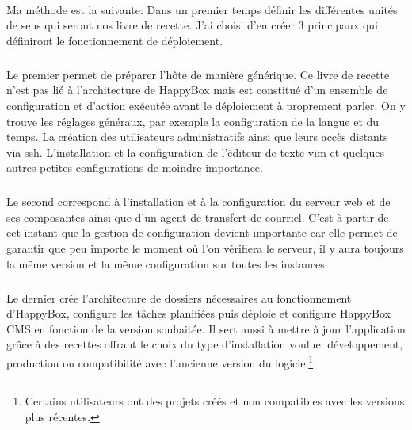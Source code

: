 \documentclass[11pt, a4paper ]{article}
\begin{document}
\begin{spacing}{1.5}
\paragraph{}
Ma méthode est la suivante: Dans un premier temps définir les différentes unités de sens qui seront nos livre de recette. J'ai choisi d'en créer 3 principaux qui définiront le fonctionnement de déploiement.
\subparagraph{}
Le premier permet de préparer l’hôte de manière générique. Ce livre de recette n'est pas lié à l'architecture de HappyBox mais est constitué d'un ensemble de configuration et d'action exécutée avant le déploiement à proprement parler. On y trouve les réglages généraux, par exemple la configuration de la langue et du temps. La création des utilisateurs administratifs ainsi que leurs accès distants via ssh. L'installation et la configuration de l’éditeur de texte vim et quelques autres petites configurations de moindre importance.
\subparagraph{}
Le second correspond à l'installation et à la configuration du serveur web et de ses composantes ainsi que d'un agent de transfert de courriel. C'est à partir de cet instant que la gestion de configuration devient importante car elle permet de garantir que peu importe le moment où l'on vérifiera le serveur, il y aura toujours la même version et la même configuration sur toutes les instances.
\subparagraph{}
Le dernier crée l'architecture de dossiers nécessaires au fonctionnement d'HappyBox, configure les tâches planifiées puis déploie et configure HappyBox CMS en fonction de la version souhaitée. Il sert aussi à mettre à jour l'application grâce à des recettes offrant le choix du type d'installation voulue: développement, production ou compatibilité avec l'ancienne version du logiciel\footnote{Certains utilisateurs ont des projets créés et non compatibles avec les versions plus récentes.}.

\end{spacing}
\end{document}
